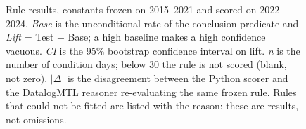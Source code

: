 \begin{figure}
\begin{tabular}{lllrrrrrrrl}
\bottomrule
\end{tabular}
\caption{\small{Rule results, constants frozen on 2015--2021 and scored on 2022--2024. \emph{Base} is the unconditional rate of the conclusion predicate and \emph{Lift} = Test $-$ Base; a high baseline makes a high confidence vacuous. \emph{CI} is the 95\% bootstrap confidence interval on lift. \emph{n} is the number of condition days; below 30 the rule is not scored (blank, not zero). $|\Delta|$ is the disagreement between the Python scorer and the DatalogMTL reasoner re-evaluating the same frozen rule. Rules that could not be fitted are listed with the reason: these are results, not omissions.}}
\label{fig:rule-results_classifier}
\end{figure}
